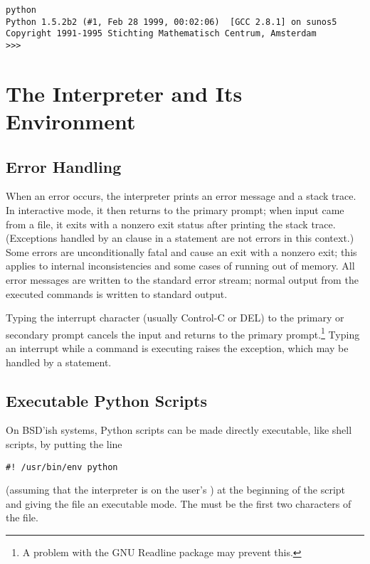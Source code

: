 \documentclass{manual}
\begin{document}
\begin{verbatim}
python
Python 1.5.2b2 (#1, Feb 28 1999, 00:02:06)  [GCC 2.8.1] on sunos5
Copyright 1991-1995 Stichting Mathematisch Centrum, Amsterdam
>>>
\end{verbatim}

\section{The Interpreter and Its Environment \label{interp}}

\subsection{Error Handling \label{error}}

When an error occurs, the interpreter prints an error
message and a stack trace.  In interactive mode, it then returns to
the primary prompt; when input came from a file, it exits with a
nonzero exit status after printing
the stack trace.  (Exceptions handled by an  clause in a
 statement are not errors in this context.)  Some errors are
unconditionally fatal and cause an exit with a nonzero exit; this
applies to internal inconsistencies and some cases of running out of
memory.  All error messages are written to the standard error stream;
normal output from the executed commands is written to standard
output.

Typing the interrupt character (usually Control-C or DEL) to the
primary or secondary prompt cancels the input and returns to the
primary prompt.\footnote{
        A problem with the GNU Readline package may prevent this.
}
Typing an interrupt while a command is executing raises the
 exception, which may be handled by a
 statement.

\subsection{Executable Python Scripts \label{scripts}}

On BSD'ish \UNIX{} systems, Python scripts can be made directly
executable, like shell scripts, by putting the line

\begin{verbatim}
#! /usr/bin/env python
\end{verbatim}

(assuming that the interpreter is on the user's ) at the
beginning of the script and giving the file an executable mode.  The
\samp{\#!} must be the first two characters of the file.
\end{document}
